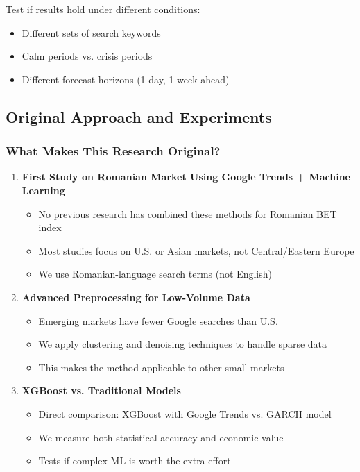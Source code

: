\documentclass[12pt,a4paper]{article}
\begin{document}
Test if results hold under different conditions:
\begin{itemize}
    \item Different sets of search keywords
    \item Calm periods vs. crisis periods
    \item Different forecast horizons (1-day, 1-week ahead)
\end{itemize}

\subsection{Original Approach and Experiments}

\subsubsection{What Makes This Research Original?}

\begin{enumerate}
    \item \textbf{First Study on Romanian Market Using Google Trends + Machine Learning}
    \begin{itemize}
        \item No previous research has combined these methods for Romanian BET index
        \item Most studies focus on U.S. or Asian markets, not Central/Eastern Europe
        \item We use Romanian-language search terms (not English)
    \end{itemize}
    
    \item \textbf{Advanced Preprocessing for Low-Volume Data}
    \begin{itemize}
        \item Emerging markets have fewer Google searches than U.S.
        \item We apply clustering and denoising techniques to handle sparse data
        \item This makes the method applicable to other small markets
    \end{itemize}
    
    \item \textbf{XGBoost vs. Traditional Models}
    \begin{itemize}
        \item Direct comparison: XGBoost with Google Trends vs. GARCH model
        \item We measure both statistical accuracy and economic value
        \item Tests if complex ML is worth the extra effort
    \end{itemize}
\end{enumerate}
\end{document}
